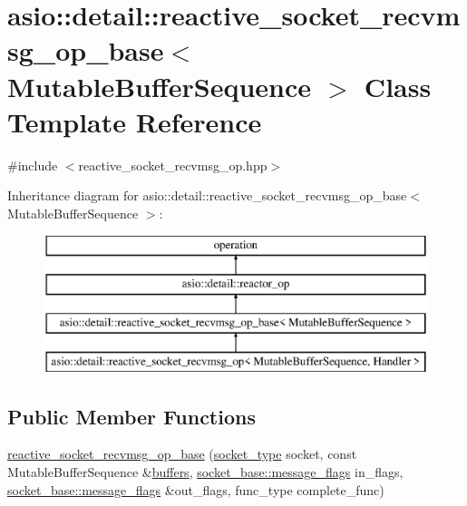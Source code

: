 \hypertarget{classasio_1_1detail_1_1reactive__socket__recvmsg__op__base}{}\section{asio\+:\+:detail\+:\+:reactive\+\_\+socket\+\_\+recvmsg\+\_\+op\+\_\+base$<$ Mutable\+Buffer\+Sequence $>$ Class Template Reference}
\label{classasio_1_1detail_1_1reactive__socket__recvmsg__op__base}


{\ttfamily \#include $<$reactive\+\_\+socket\+\_\+recvmsg\+\_\+op.\+hpp$>$}

Inheritance diagram for asio\+:\+:detail\+:\+:reactive\+\_\+socket\+\_\+recvmsg\+\_\+op\+\_\+base$<$ Mutable\+Buffer\+Sequence $>$\+:\begin{figure}[H]
\begin{center}
\leavevmode
\includegraphics[height=4.000000cm]{classasio_1_1detail_1_1reactive__socket__recvmsg__op__base}
\end{center}
\end{figure}
\subsection*{Public Member Functions}
\begin{DoxyCompactItemize}
\item 
\hyperlink{classasio_1_1detail_1_1reactive__socket__recvmsg__op__base_ae84e7e5ece471116f543eeaba78bc605}{reactive\+\_\+socket\+\_\+recvmsg\+\_\+op\+\_\+base} (\hyperlink{namespaceasio_1_1detail_a6798c771dd84b79798b1a08150706ea9}{socket\+\_\+type} socket, const Mutable\+Buffer\+Sequence \&\hyperlink{group__async__read_ga54dede45c3175148a77fe6635222c47d}{buffers}, \hyperlink{classasio_1_1socket__base_ac3cf77465dfedfe1979b5415cf32cc94}{socket\+\_\+base\+::message\+\_\+flags} in\+\_\+flags, \hyperlink{classasio_1_1socket__base_ac3cf77465dfedfe1979b5415cf32cc94}{socket\+\_\+base\+::message\+\_\+flags} \&out\+\_\+flags, func\+\_\+type complete\+\_\+func)
\end{DoxyCompactItemize}
